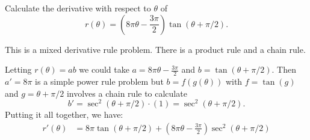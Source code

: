 \documentclass{ximera}
\author{Emma Smith Zbarsky}
\begin{document}
\begin{exercise}

Calculate the derivative with respect to $\theta$ of
\[r(\theta) = \left(8\pi\theta-\frac{3\pi}{2}\right)\tan(\theta+\pi/2).\]


\begin{hint}
This is a mixed derivative rule problem. There is a product rule and a
chain rule.
\end{hint}


\begin{hint}
Letting $r(\theta) = ab$ we could take $a = 8\pi\theta-\frac{3\pi}{2}$
and $b = \tan(\theta+\pi/2)$. Then $a'=8\pi$ is a simple power rule
problem but $b = f(g(\theta))$ with $f = \tan(g)$ and $g = \theta+\pi/2$
involves a chain rule to calculate
\[b' = \sec^2(\theta+\pi/2)\cdot(1) = \sec^2(\theta+\pi/2).\] Putting it
all together, we have: \begin{align*}
r'(\theta) &= 8\pi\tan(\theta+\pi/2) + \left(8\pi\theta-\frac{3\pi}{2}\right)\sec^2(\theta+\pi/2)
\end{align*}
\end{hint}


\begin{multipleChoice}
\end{multipleChoice}

\end{exercise}
\end{document}
